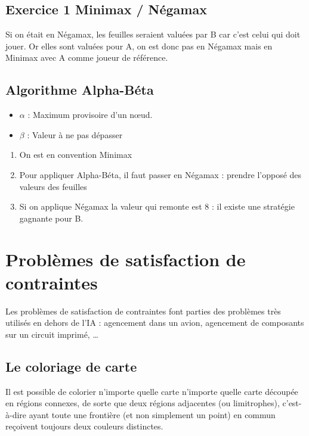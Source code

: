 \documentclass[12pt,a4paper,openany]{book}
\begin{document}
	\section{Exercice 1 Minimax / Négamax}
	Si on était en Négamax, les feuilles seraient valuées par B car c'est celui qui doit jouer. Or elles sont valuées pour A, on est donc pas en
	Négamax mais en Minimax avec A comme joueur de référence.
	
	\section{Algorithme Alpha-Béta}
\begin{itemize}
	\item $\alpha$ : Maximum provisoire d'un nœud.
	\item $\beta$ : Valeur à ne pas dépasser
\end{itemize}

\begin{enumerate}
	\item On est en convention Minimax
	\item Pour appliquer Alpha-Béta, il faut passer en Négamax : prendre l'opposé des valeurs des feuilles
	\item Si on applique Négamax la valeur qui remonte est 8 : il existe une stratégie gagnante pour B.
\end{enumerate}
	\chapter{Problèmes de satisfaction de contraintes}
	Les problèmes de satisfaction de contraintes font parties des problèmes très utilisés en dehors de l'IA : agencement dans un avion, agencement de
	composants sur un circuit imprimé, …
	\section{Le coloriage de carte}
	\begin{remarque}
		Il est possible de colorier n'importe quelle carte n'importe quelle carte découpée en régions connexes, de sorte que deux régions adjacentes (ou limitrophes), c'est-à-dire ayant toute une
		frontière (et non simplement un point) en commun reçoivent toujours deux couleurs distinctes. 
	\end{remarque}
\end{document}
